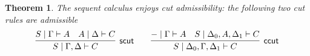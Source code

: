 \documentclass[submission,copyright,creativecommons]{eptcs}
\newtheorem{theorem}{Theorem}[section]
\theoremstyle{definition}
\newcommand{\andlone}{\land \mathsf{L}_{1}}
\newcommand{\andltwo}{\land \mathsf{L}_{2}}
\newcommand{\andr}{\land \mathsf{R}}
\newcommand{\orl}{\lor \mathsf{L}}
\newcommand{\orrone}{\lor \mathsf{R}_{1}}
\newcommand{\orrtwo}{\lor \mathsf{R}_{2}}
\newcommand{\ax}{\mathsf{ax}}
\newcommand{\proofbox}[1]{\begin{tabular}{l} #1 \end{tabular}}
\newcommand\niccolo[1]{\mbox{}
{\marginpar{\color{red}NV}}
{\sf\noindent\color{red}#1}}%
\begin{document}
\begin{theorem}
  The sequent calculus enjoys cut admissibility: the following two cut rules are admissible
    \begin{displaymath}
      \infer[\mathsf{scut}]{S \mid \Gamma , \Delta \vdash C}{
        S \mid \Gamma \vdash A
        &
        A \mid \Delta \vdash C
      }
      \qquad
      \infer[\mathsf{ccut}]{S \mid \Delta_0 , \Gamma , \Delta_1 \vdash C}{
        {-} \mid \Gamma \vdash A
        &
        S \mid \Delta_0 , A , \Delta_1 \vdash C
      }
    \end{displaymath}
\end{theorem}


  
\end{document}
